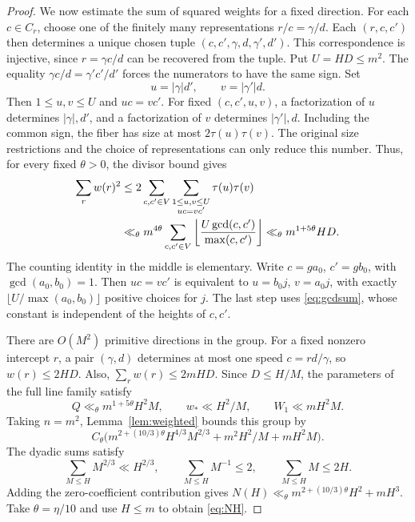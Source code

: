 \documentclass[12pt,leqno]{article}
\numberwithin{equation}{section}
\theoremstyle{remark}
\begin{document}
\begin{proof}
We now estimate the sum of squared weights for a fixed direction. For each $c\in C_r$, choose one of the finitely many representations $r/c=\gamma/d$. Each $(r,c,c')$ then determines a unique chosen tuple $(c,c',\gamma,d,\gamma',d')$. This correspondence is injective, since $r=\gamma c/d$ can be recovered from the tuple. Put $U=HD\le m^2$. The equality $\gamma c/d=\gamma'c'/d'$ forces the numerators to have the same sign. Set
\[
u=|\gamma|d',\qquad v=|\gamma'|d.
\]
Then $1\le u,v\le U$ and $uc=vc'$. For fixed $(c,c',u,v)$, a factorization of $u$ determines $|\gamma|,d'$, and a factorization of $v$ determines $|\gamma'|,d$. Including the common sign, the fiber has size at most $2\tau(u)\tau(v)$. The original size restrictions and the choice of representations can only reduce this number. Thus, for every fixed $\theta>0$, the divisor bound gives
\begin{align}\label{eq:energy}
\sum_rw(r)^2
&\le 2\sum_{c,c'\in V}\sum_{\substack{1\le u,v\le U\\uc=vc'}}\tau(u)\tau(v)\notag\\
&\ll_\theta m^{4\theta}\sum_{c,c'\in V}
\left\lfloor\frac{U\gcd(c,c')}{\max(c,c')}\right\rfloor
\ll_\theta m^{1+5\theta}HD.
\end{align}
The counting identity in the middle is elementary. Write $c=g a_0$, $c'=g b_0$, with $\gcd(a_0,b_0)=1$. Then $uc=vc'$ is equivalent to $u=b_0j$, $v=a_0j$, with exactly $\lfloor U/\max(a_0,b_0)\rfloor$ positive choices for $j$. The last step uses \eqref{eq:gcdsum}, whose constant is independent of the heights of $c,c'$.

There are $O(M^2)$ primitive directions in the group. For a fixed nonzero intercept $r$, a pair $(\gamma,d)$ determines at most one speed $c=rd/\gamma$, so $w(r)\le2HD$. Also, $\sum_rw(r)\le2mHD$. Since $D\le H/M$, the parameters of the full line family satisfy
\[
Q\ll_\theta m^{1+5\theta}H^2M,\qquad
w_*\ll H^2/M,\qquad W_1\ll mH^2M.
\]
Taking $n=m^2$, Lemma~\ref{lem:weighted} bounds this group by
\[
C_\theta\bigl(m^{2+(10/3)\theta}H^{4/3}M^{2/3}
+m^2H^2/M+mH^2M\bigr).
\]
The dyadic sums satisfy
\[
\sum_{M\le H}M^{2/3}\ll H^{2/3},\qquad
\sum_{M\le H}M^{-1}\le2,\qquad
\sum_{M\le H}M\le2H.
\]
Adding the zero-coefficient contribution gives $N(H)\ll_\theta m^{2+(10/3)\theta}H^2+mH^3$. Take $\theta=\eta/10$ and use $H\le m$ to obtain \eqref{eq:NH}.
\end{proof}
\end{document}
